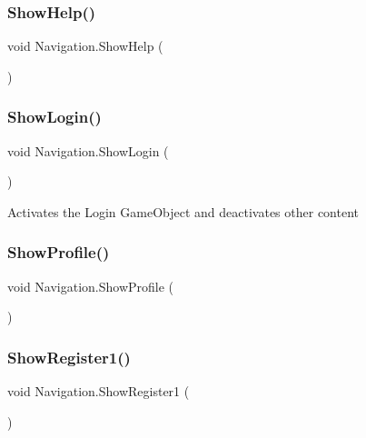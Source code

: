 \subsubsection{\texorpdfstring{Show\+Help()}{ShowHelp()}}
{\footnotesize\ttfamily void Navigation.\+Show\+Help (\begin{DoxyParamCaption}{ }\end{DoxyParamCaption})\hspace{0.3cm}{\ttfamily [inline]}}

\mbox{\label{classNavigation_a288d2b756704cdde0879b922835f7489}} 
\subsubsection{\texorpdfstring{Show\+Login()}{ShowLogin()}}
{\footnotesize\ttfamily void Navigation.\+Show\+Login (\begin{DoxyParamCaption}{ }\end{DoxyParamCaption})\hspace{0.3cm}{\ttfamily [inline]}}



Activates the Login Game\+Object and deactivates other content 

\mbox{\label{classNavigation_ad8994936c6b8f470c56fa497b284ddf5}} 
\subsubsection{\texorpdfstring{Show\+Profile()}{ShowProfile()}}
{\footnotesize\ttfamily void Navigation.\+Show\+Profile (\begin{DoxyParamCaption}{ }\end{DoxyParamCaption})\hspace{0.3cm}{\ttfamily [inline]}}

\mbox{\label{classNavigation_ab7c8d6dd421eeac7ebbafd373f478583}} 
\subsubsection{\texorpdfstring{Show\+Register1()}{ShowRegister1()}}
{\footnotesize\ttfamily void Navigation.\+Show\+Register1 (\begin{DoxyParamCaption}{ }\end{DoxyParamCaption})\hspace{0.3cm}{\ttfamily [inline]}}



